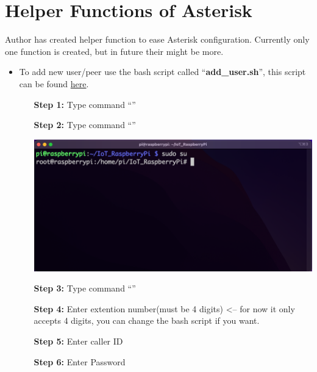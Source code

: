 \section{Helper Functions of Asterisk}	\label{sec:helper-asterisk}
	Author has created helper function to ease Asterisk configuration. Currently only one function is created, but in future their might be more. 
	\begin{itemize}
		\item To add new user/peer use the bash script called ``\textbf{add\_user.sh}'', this script can be found \href{https://github.com/TrupeshKumarPatel/IoT_RaspberryPi/tree/final_submission/source_code/asterisk_helper_scripts}{here}.
			\begin{itemize}[leftmargin=1.7cm]
				\item[\textbf{Step 1:}] Type command ``{\selectfont{cd IoT\_RaspberryPi}}''\\
				\item[\textbf{Step 2:}] Type command ``{\selectfont{sudo su}}''\\
					\begin{minipage}{\textwidth}
						\vspace{2mm}
						\includegraphics[scale=0.35]{Images/raspberry_pi/asterisk_helper/sudo.png}
						\vspace{2mm}
					\end{minipage}
				\item[\textbf{Step 3:}] Type command ``{\selectfont{bash source\_code/asterisk\_helper\_scripts/add\_user.sh}}''
				\item[\textbf{Step 4:}] Enter extention number(must be 4 digits) <-- for now it only accepts 4 digits, you can change the bash script if you want.
				\item[\textbf{Step 5:}] Enter caller ID
				\item[\textbf{Step 6:}] Enter Password	\\

\end{itemize}
\end{itemize}

